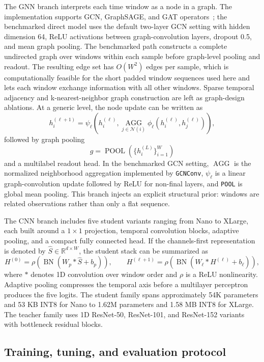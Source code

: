 The GNN branch interprets each time window as a node in a graph. The implementation supports GCN, GraphSAGE, and GAT operators~\citep{kipf2017gcn,hamilton2017graphsage,velickovic2018gat}; the benchmarked direct model uses the default two-layer GCN setting with hidden dimension 64, ReLU activations between graph-convolution layers, dropout 0.5, and mean graph pooling. The benchmarked path constructs a complete undirected graph over windows within each sample before graph-level pooling and readout. The resulting edge set has $O(W^2)$ edges per sample, which is computationally feasible for the short padded window sequences used here and lets each window exchange information with all other windows. Sparse temporal adjacency and k-nearest-neighbor graph construction are left as graph-design ablations. At a generic level, the node update can be written as
\[
h_i^{(\ell+1)} =
\psi_\ell\!\left(
h_i^{(\ell)},
\operatorname*{AGG}_{j \in \mathcal{N}(i)}
\phi_\ell\!\left(h_i^{(\ell)}, h_j^{(\ell)}\right)
\right),
\]
followed by graph pooling
\[
g = \operatorname{POOL}\!\left(\{h_i^{(L)}\}_{i=1}^{W}\right)
\]
and a multilabel readout head. In the benchmarked GCN setting, $\operatorname*{AGG}$ is the normalized neighborhood aggregation implemented by \texttt{GCNConv}, $\psi_\ell$ is a linear graph-convolution update followed by ReLU for non-final layers, and \texttt{POOL} is global mean pooling. This branch injects an explicit structural prior: windows are related observations rather than only a flat sequence.

The CNN branch includes five student variants ranging from Nano to XLarge, each built around a $1 \times 1$ projection, temporal convolution blocks, adaptive pooling, and a compact fully connected head. If the channels-first representation is denoted by $\hat{S} \in \mathbb{R}^{d \times W}$, the student stack can be summarized as
\[
H^{(0)} = \rho\!\left(\operatorname{BN}(W_p * \hat{S} + b_p)\right),
\qquad
H^{(\ell+1)} = \rho\!\left(\operatorname{BN}(W_\ell * H^{(\ell)} + b_\ell)\right),
\]
where $*$ denotes 1D convolution over window order and $\rho$ is a ReLU nonlinearity. Adaptive pooling compresses the temporal axis before a multilayer perceptron produces the five logits. The student family spans approximately 54K parameters and 53 KB INT8 for Nano to 1.62M parameters and 1.58 MB INT8 for XLarge. The teacher family uses 1D ResNet-50, ResNet-101, and ResNet-152 variants with bottleneck residual blocks.

\subsection{Training, tuning, and evaluation protocol}

